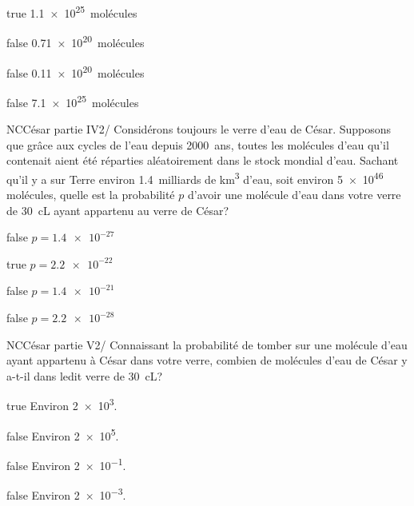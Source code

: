             \begin{reponses}
            	\item[true]    \SI{1.1e25}{molécules}
            	\item[false]   \SI{.71e20}{molécules}
                \item[false]   \SI{.11e20}{molécules}
                \item[false]   \SI{7.1e25}{molécules}
            \end{reponses}
            \begin{question}{NC}{César partie IV}{2}{/}
				  Considérons toujours le verre d'eau de César. Supposons que grâce aux cycles de l’eau depuis \SI{2000}{ans}, toutes les molécules d’eau qu'il contenait aient été réparties aléatoirement dans le stock mondial d’eau.  Sachant qu'il y a sur Terre environ \num{1.4}~milliards de \si{\kilo\meter\cubed} d’eau, soit environ \num{5e46} molécules, quelle est la probabilité $p$ d'avoir une molécule d'eau dans votre verre de \SI{30}{\centi\liter} ayant appartenu au verre de César? 
            \end{question}
            \begin{reponses}
            	\item[false] $p = \num{1.4e-27}$
            	\item[true] $p = \num{2.2e-22}$
                \item[false] $p = \num{1.4e-21}$
                \item[false] $p = \num{2.2e-28}$
            \end{reponses}
            \begin{question}{NC}{César partie V}{2}{/}
				  Connaissant la probabilité de tomber sur une molécule d'eau ayant appartenu à César dans votre verre, combien de molécules d'eau de César y a-t-il dans ledit verre de \SI{30}{\centi\liter}?  
            \end{question}
            \begin{reponses}
            	\item[true] Environ \num{2e3}.
            	\item[false]   Environ \num{2e5}.
                \item[false]   Environ \num{2e-1}.
                \item[false]   Environ \num{2e-3}.
            \end{reponses}
